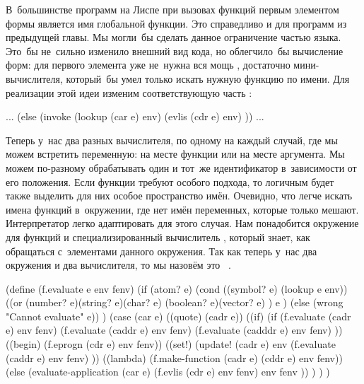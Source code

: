 В~большинстве программ на Лиспе при вызовах функций первым элементом формы
является имя глобальной функции. Это справедливо и для программ из предыдущей
главы. Мы могли~бы сделать данное ограничение частью языка. Это~бы не~сильно
изменило внешний вид кода, но облегчило~бы вычисление форм: для первого элемента
уже не~нужна вся мощь , достаточно мини-вычислителя, который~бы
умел только искать нужную функцию по имени. Для реализации этой идеи изменим
соответствующую часть :

\begin{code:lisp}
...
(else (invoke (lookup (car e) env)
              (evlis (cdr e) env) )) ...
\end{code:lisp}

Теперь у~нас два разных вычислителя, по одному на каждый случай, где мы можем
встретить переменную: на месте функции или на месте аргумента. Мы можем
по-разному обрабатывать один и тот~же идентификатор в~зависимости от его
положения. Если функции требуют особого подхода, то логичным будет также
выделить для них особое пространство имён. Очевидно, что легче искать имена
функций в~окружении, где нет имён переменных, которые только мешают.
Интерпретатор легко адаптировать для этого случая. Нам понадобится окружение
для функций  и специализированный вычислитель
, который знает, как обращаться с~элементами данного
окружения. Так как теперь у~нас два окружения и два вычислителя, то мы назовём
это ~\cite{sg93}.

\begin{code:lisp}
(define (f.evaluate e env fenv)
  (if (atom? e)
      (cond ((symbol? e) (lookup e env))
            ((or (number? e)(string? e)(char? e)
                 (boolean? e)(vector? e) )
             e )
            (else (wrong "Cannot evaluate" e)) )
      (case (car e)
        ((quote)  (cadr e))
        ((if)     (if (f.evaluate (cadr e) env fenv)
                      (f.evaluate (caddr e) env fenv)
                      (f.evaluate (cadddr e) env fenv) ))
        ((begin)  (f.eprogn (cdr e) env fenv))
        ((set!)   (update! (cadr e)
                           env
                           (f.evaluate (caddr e) env fenv) ))
        ((lambda) (f.make-function (cadr e) (cddr e) env fenv))
        (else     (evaluate-application (car e)
                                        (f.evlis (cdr e) env fenv)
                                        env
                                        fenv )) ) ) )
\end{code:lisp}

